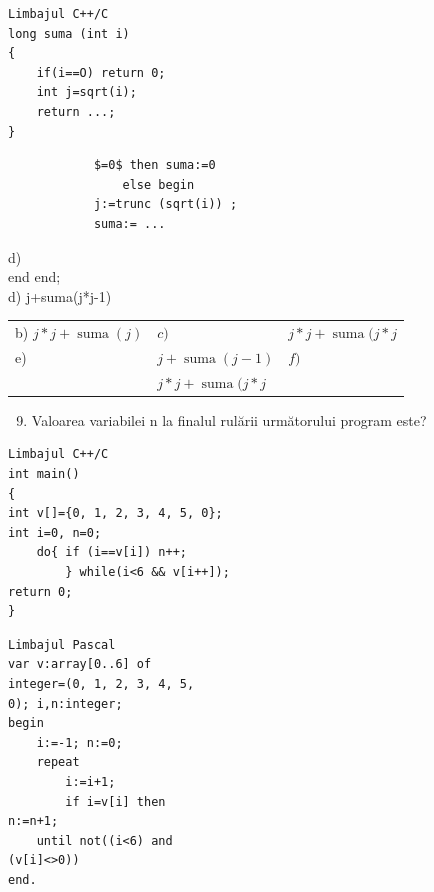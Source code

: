 \documentclass[10pt]{article}
\begin{document}
\begin{verbatim}
Limbajul C++/C
long suma (int i)
{
    if(i==O) return 0;
    int j=sqrt(i);
    return ...;
}
\end{verbatim}

\begin{verbatim}
            $=0$ then suma:=0
                else begin
            j:=trunc (sqrt(i)) ;
            suma:= ...
\end{verbatim}

d)\\
end end;\\
d) j+suma(j*j-1)

\begin{center}
\begin{tabular}{lll}
b) $j * j+\operatorname{suma}(j)$ & $c)$ & $j * j+\operatorname{suma}(j * j$ \\
e) & $j+\operatorname{suma}(j-1)$ & $f)$ \\
 & $j * j+\operatorname{suma}(j * j$ &  \\
\end{tabular}
\end{center}

\begin{enumerate}
  \setcounter{enumi}{8}
  \item Valoarea variabilei n la finalul rulării următorului program este?
\end{enumerate}

\begin{verbatim}
Limbajul C++/C
int main()
{
int v[]={0, 1, 2, 3, 4, 5, 0};
int i=0, n=0;
    do{ if (i==v[i]) n++;
        } while(i<6 && v[i++]);
return 0;
}
\end{verbatim}

\begin{verbatim}
Limbajul Pascal
var v:array[0..6] of
integer=(0, 1, 2, 3, 4, 5,
0); i,n:integer;
begin
    i:=-1; n:=0;
    repeat
        i:=i+1;
        if i=v[i] then
n:=n+1;
    until not((i<6) and
(v[i]<>0))
end.
\end{verbatim}
\end{document}
